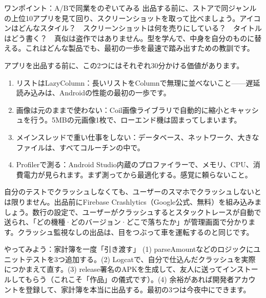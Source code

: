\begin{tcbinfo}{ワンポイント：A/Bで同業をのぞいてみる}
出品する前に、ストアで同ジャンルの上位10アプリを見て回り、スクリーンショットを取って比べましょう。アイコンはどんなスタイル？　スクリーンショットは何を売りにしている？　タイトルはどう書く？　真似は盗作ではありません。型を学んで、中身を自分のものに替える。これはどんな製品でも、最初の一歩を最速で踏み出すための教訓です。

\end{tcbinfo}


アプリを出品する前に、この2つにはそれぞれ30分かける価値があります。


\begin{enumerate}
  \item リストはLazyColumn：長いリストをColumnで無理に並べないこと——遅延読み込みは、Androidの性能の最初の一歩です。
  \item 画像は元のままで使わない：Coil画像ライブラリで自動的に縮小とキャッシュを行う。5MBの元画像1枚で、ローエンド機は固まってしまいます。
  \item メインスレッドで重い仕事をしない：データベース、ネットワーク、大きなファイルは、すべてコルーチンの中で。
  \item Profilerで測る：Android Studio内蔵のプロファイラーで、メモリ、CPU、消費電力が見られます。まず測ってから最適化する。感覚に頼らないこと。
\end{enumerate}


自分のテストでクラッシュしなくても、ユーザーのスマホでクラッシュしないとは限りません。出品前にFirebase Crashlytics（Google公式、無料）を組み込みましょう。数行の設定で、ユーザーがクラッシュするとスタックトレースが自動で送られ、「どの機種·どのバージョン·どこで落ちたか」が管理画面で分かります。クラッシュ監視なしの出品は、目をつぶって車を運転するのと同じです。

\begin{tcbpractice}{やってみよう：家計簿を一度「引き渡す」}
(1) parseAmountなどのロジックにユニットテストを3つ追加する。(2) Logcatで、自分で仕込んだクラッシュを実際につかまえて直す。(3) release署名のAPKを生成して、友人に送ってインストールしてもらう（これこそ「作品」の儀式です）。(4) 余裕があれば開発者アカウントを登録して、家計簿を本当に出品する。最初の3つは今夜中にできます。

\end{tcbpractice}

